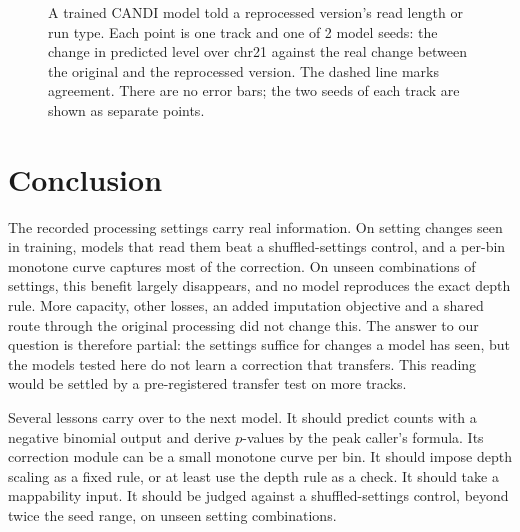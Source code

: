 \documentclass[pdflatex,sn-mathphys-num]{sn-jnl}
\newcommand{\lit}[1]{#1}
\begin{document}
\begin{figure}[t]
\centering
{}
\caption{A trained CANDI model told a reprocessed version's read length or run type. Each
point is one track and one of \lit{2} model seeds: the change in predicted level over
\lit{chr21} against the real change between the original and the reprocessed version. The
dashed line marks agreement. There are no error bars; the two seeds of each track are shown as
separate points.}\label{fig:candi}
\end{figure}

\section{Conclusion}\label{sec:conclusion}

The recorded processing settings carry real information. On setting changes seen in training,
models that read them beat a shuffled-settings control, and a per-bin monotone curve captures
most of the correction. On unseen combinations of settings, this benefit largely disappears,
and no model reproduces the exact depth rule. More capacity, other losses, an added
imputation objective and a shared route through the original processing did not change this.
The answer to our question is therefore partial: the settings suffice for changes a model has
seen, but the models tested here do not learn a correction that transfers. This reading would be
settled by a pre-registered transfer test on more tracks.

Several lessons carry over to the next model. It should predict counts with a negative
binomial output and derive $p$-values by the peak caller's formula. Its correction module can
be a small monotone curve per bin. It should impose depth scaling as a fixed rule, or at least
use the depth rule as a check. It should take a mappability input. It should be judged against
a shuffled-settings control, beyond twice the seed range, on unseen setting combinations.
\end{document}
